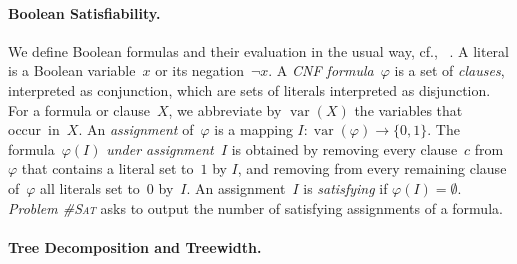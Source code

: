 \documentclass{llncs}
\newcommand{\longversion}[1]{#1}
\newcommand{\cSAT}{\textsc{\#Sat}\xspace}%
\DeclareMathOperator{\var}{var}
\begin{document}
\paragraph*{Boolean Satisfiability.}
  We define Boolean formulas and their evaluation in the usual
  way, cf., ~\cite{GomesKautzSabharwalSelman08a,KleineBuningLettman99}.
  A literal is a Boolean variable~$x$ or its negation~$\neg
  x$.
  A \emph{CNF formula}~$\varphi$ is a set of \emph{clauses}, interpreted as conjunction, which are sets of literals
  interpreted as disjunction. For a formula or clause~$X$, we
  abbreviate by $\var(X)$ the variables that occur~in~$X$.
%
%
%
%
%
%
%
%
%
An \emph{assignment} of~$\varphi$ is a mapping
$I: \var(\varphi) \rightarrow \{0,1\}$.
%
%
%
%
%
%
%
The formula~$\varphi(I)$ \emph{under assignment~$I$} is obtained
by removing every clause~$c$ from $\varphi$ that contains a literal set to~$1$
by $I$, and removing from every remaining clause of~$\varphi$ all literals set
to~$0$ by~$I$. An assignment~$I$ is \emph{satisfying} if
$\varphi(I)=\emptyset$.
%
\emph{Problem \cSAT} asks to output the number of satisfying assignments
of a formula.
%
%
%
%
%
%
%
%
%
%
%
%
%
%
%
%
%
%
%
%
%
%



%

%
\paragraph*{Tree Decomposition and Treewidth.} %
%
\end{document}
